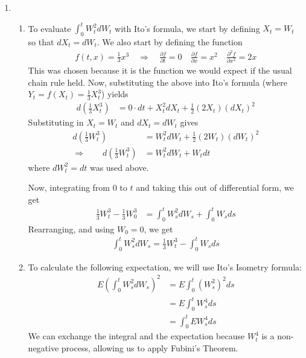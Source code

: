 \documentclass[12pt]{article}
\theoremstyle{plain}
\theoremstyle{definition}
\theoremstyle{remark}
\begin{document}
\begin{enumerate}
\begin{enumerate}
  \end{enumerate}

  \item %
    \begin{enumerate}
      \item %
        To evaluate $\int^t_0 W_t^2 dW_t$ with Ito's formula, we start
        by defining $X_t = W_t$ so that $dX_t = dW_t$. We also start by
        defining the function
        \begin{align*}
          f(t,x) = \frac{1}{3} x^3 \quad \Rightarrow \quad
          \frac{\partial f}{\partial t} = 0 \quad
          \frac{\partial f}{\partial x} = x^2 \quad
          \frac{\partial^2 f}{\partial x^2} = 2x
        \end{align*}
        This was chosen because it is the function we would expect if
        the usual chain rule held. Now, substituting the above into
        Ito's formula (where $Y_t=f(X_t) = \frac{1}{3}X^3_t$) yields
        \begin{align*}
          d\left(\frac{1}{3} X_t^3\right)
          &= 0 \cdot dt + X^2_t dX_t
          + \frac{1}{2} \left(2X_t\right) \left(dX_t\right)^2
        \end{align*}
        Substituting in $X_t=W_t$ and $dX_t=dW_t$ gives
        \begin{align*}
          d\left(\frac{1}{3} W_t^3\right)
          &= W^2_t dW_t + \frac{1}{2} \left(2W_t\right)
          \left(dW_t\right)^2\\
          \Rightarrow \qquad
          d\left(\frac{1}{3} W_t^3\right)
          &= W^2_t dW_t + W_t dt
        \end{align*}
        where $dW_t^2 = dt$ was used above.

        Now, integrating from $0$ to $t$ and taking this out of
        differential form, we get
        \begin{align*}
          \frac{1}{3} W_t^3 -
          \frac{1}{3} W_0^3
          &= \int^t_0 W^2_s dW_s + \int^t_0 W_s ds
        \end{align*}
        Rearranging, and using $W_0=0$, we get
        \begin{align*}
          \int^t_0 W^2_s dW_s =
          \frac{1}{3} W_t^3 - \int^t_0 W_s ds
        \end{align*}

      \item %
        To calculate the following expectation, we will use Ito's
        Isometry formula:
        \begin{align*}
          E\left(\int^t_0 W_s^2 dW_s\right)^2
          &= E\int^t_0 \left(W_s^2\right)^2 ds\\
          &= E\int^t_0 W_s^4 ds\\
          &= \int^t_0 EW_s^4 ds
        \end{align*}
        We can exchange the integral and the expectation because $W^4_t$
        is a non-negative process, allowing us to apply Fubini's
        Theorem.


\end{enumerate}
\end{enumerate}
\end{document}
